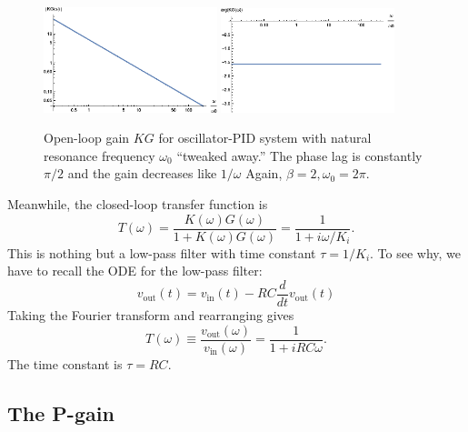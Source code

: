 \documentclass{article}
\theoremstyle{definition}
\newcommand{\f}[2]{\frac{#1}{#2}}
\begin{document}
\begin{figure}[!htb]
	\centering
	\includegraphics[width=0.45\textwidth]{bode_3}
	\quad
	\includegraphics[width=0.45\textwidth]{bode_4}
	\caption{Open-loop gain $KG$ for oscillator-PID system with natural resonance frequency $\omega_0$ ``tweaked away.'' The phase lag is constantly $\pi/2$ and the gain decreases like $1/\omega$ Again, $\beta = 2,\omega_0 = 2\pi$.} %
	\label{fig:bode_2}
\end{figure}




\noindent Meanwhile, the closed-loop transfer function is 
\begin{equation*}
T(\omega) = \f{K(\omega)G(\omega)}{1+ K(\omega) G(\omega)} = \f{1}{1+ i\omega/K_i}.
\end{equation*}
This is nothing but a low-pass filter with time constant $\tau = 1/K_i$. To see why, we have to recall the ODE for the low-pass filter: 
\begin{equation*}
v_\text{out}(t) = v_\text{in} (t) - RC \f{d}{dt}v_\text{out}(t)
\end{equation*}
Taking the Fourier transform and rearranging gives
\begin{equation*}
T(\omega) \equiv \f{v_\text{out}(\omega)}{v_\text{in}(\omega)} = \f{1}{1+iRC \omega}.
\end{equation*}
The time constant is $\tau = RC$. 




\subsection{The P-gain}
\end{document}

